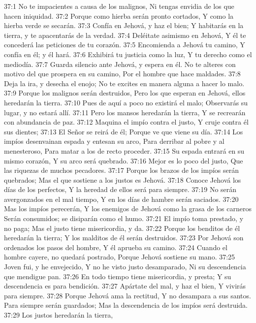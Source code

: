 37:1 No te impacientes a causa de los malignos, 
Ni tengas envidia de los que hacen iniquidad. 
37:2 Porque como hierba serán pronto cortados, 
Y como la hierba verde se secarán. 
37:3 Confía en Jehová, y haz el bien; 
Y habitarás en la tierra, y te apacentarás de la verdad. 
37:4 Deléitate asimismo en Jehová, 
Y él te concederá las peticiones de tu corazón. 
37:5 Encomienda a Jehová tu camino, 
Y confía en él; y él hará. 
37:6 Exhibirá tu justicia como la luz, 
Y tu derecho como el mediodía. 
37:7 Guarda silencio ante Jehová, y espera en él. 
No te alteres con motivo del que prospera en su camino, 
Por el hombre que hace maldades. 
37:8 Deja la ira, y desecha el enojo; 
No te excites en manera alguna a hacer lo malo. 
37:9 Porque los malignos serán destruidos, 
Pero los que esperan en Jehová, ellos heredarán la tierra. 
37:10 Pues de aquí a poco no existirá el malo; 
Observarás su lugar, y no estará allí. 
37:11 Pero los mansos heredarán la tierra, 
Y se recrearán con abundancia de paz. 
37:12 Maquina el impío contra el justo, 
Y cruje contra él sus dientes; 
37:13 El Señor se reirá de él; 
Porque ve que viene su día. 
37:14 Los impíos desenvainan espada y entesan su arco, 
Para derribar al pobre y al menesteroso, 
Para matar a los de recto proceder. 
37:15 Su espada entrará en su mismo corazón, 
Y su arco será quebrado. 
37:16 Mejor es lo poco del justo, 
Que las riquezas de muchos pecadores. 
37:17 Porque los brazos de los impíos serán quebrados; 
Mas el que sostiene a los justos es Jehová. 
37:18 Conoce Jehová los días de los perfectos, 
Y la heredad de ellos será para siempre. 
37:19 No serán avergonzados en el mal tiempo, 
Y en los días de hambre serán saciados. 
37:20 Mas los impíos perecerán, 
Y los enemigos de Jehová como la grasa de los carneros 
Serán consumidos; se disiparán como el humo. 
37:21 El impío toma prestado, y no paga; 
Mas el justo tiene misericordia, y da. 
37:22 Porque los benditos de él heredarán la tierra; 
Y los malditos de él serán destruidos. 
37:23 Por Jehová son ordenados los pasos del hombre, 
Y él aprueba su camino. 
37:24 Cuando el hombre cayere, no quedará postrado, 
Porque Jehová sostiene su mano. 
37:25 Joven fui, y he envejecido, 
Y no he visto justo desamparado, 
Ni su descendencia que mendigue pan. 
37:26 En todo tiempo tiene misericordia, y presta; 
Y su descendencia es para bendición. 
37:27 Apártate del mal, y haz el bien, 
Y vivirás para siempre. 
37:28 Porque Jehová ama la rectitud, 
Y no desampara a sus santos. 
Para siempre serán guardados; 
Mas la descendencia de los impíos será destruida. 
37:29 Los justos heredarán la tierra, 

